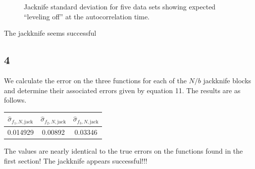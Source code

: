 \documentclass[singlepage,notitlepage,nofootinbib,11pt]{revtex4-1}
\begin{document}
\begin{figure}[h]
\caption{\label{jacks} Jacknife standard deviation for five data sets showing expected ``leveling off'' at the autocorrelation time.}
\end{figure}
 The jackknife seems successful
\subsection{4}
We calculate the error on the three functions for each of the $N/b$ jackknife blocks and determine their associated errors given by equation 11. The results are as follows.
\begin{center}
\begin{tabular}{| c | c | c |}
\hline
$\hat{\sigma}_{f_1,N,\text{jack}}$ & $\hat{\sigma}_{f_2,N,\text{jack}}$ & $\hat{\sigma}_{f_3,N,\text{jack}}$ \\ \hline\hline
0.014929 & 0.00892 & 0.03346 \\ \hline 
\end{tabular}
\end{center}
The values are nearly identical to the true errors on the functions found in the first section! The jackknife appears successful!!!
\clearpage
\end{document}

